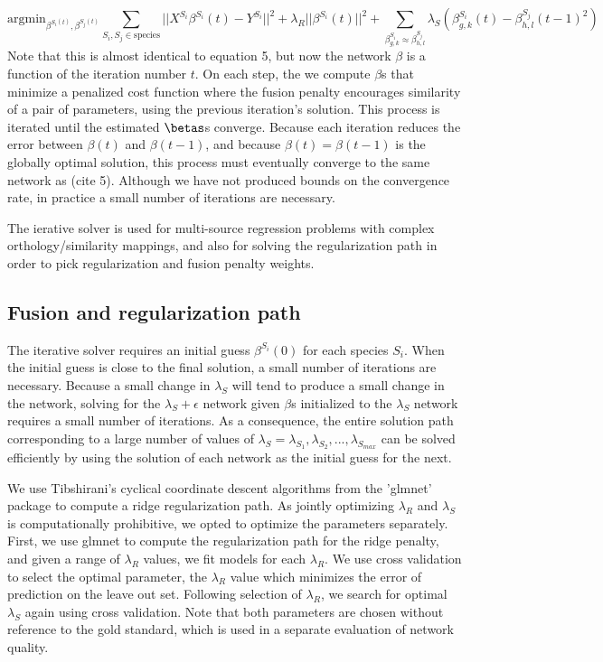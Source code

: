 \documentclass[11pt]{article}
\providecommand{\DIFadd}[1]{{\protect\color{blue}\uwave{#1}}} %
\providecommand{\DIFdel}[1]{{\protect\color{red}\sout{#1}}}                      %
\providecommand{\DIFaddbegin}{} %
\providecommand{\DIFaddend}{} %
\providecommand{\DIFdelbegin}{} %
\providecommand{\DIFdelend}{} %
\begin{document}
\begin{equation}
\text{argmin}_{\beta^{S_i(t)}, \beta^{S_j(t)}} \displaystyle\sum_{S_i, S_j \in \text{species}} ||X^{S_i}\beta^{S_i}(t) - Y^{S_i}||^2 + \lambda_R||\beta^{S_i}(t)||^2 + \displaystyle \sum_{\beta_{g,k}^{S_i} \approx \beta_{h,l}^{S_j}} \lambda_S(\beta^{S_i}_{g,k}(t) - \beta_{h,l}^{S_j}(t-1)^2)
\end{equation}
Note that this is almost identical to equation 5, but now the network $\beta$ is a function of the iteration number $t$. On each step, the we compute $\beta$s that minimize a penalized cost function where the fusion penalty encourages similarity of a pair of parameters, using the previous iteration's solution. This process is iterated until the estimated \DIFdelbegin \DIFdel{$\betas$}\DIFdelend \DIFaddbegin \DIFadd{$\beta$}\DIFaddend s converge. Because each iteration reduces the error between $\beta(t)$ and $\beta(t-1)$, and because $\beta(t) = \beta(t-1)$ is the globally optimal solution, this process must eventually converge to the same network as (cite 5). Although we have not produced bounds on the convergence rate, in practice a small number of iterations are necessary.

The ierative solver is used for multi-source regression problems with complex orthology/similarity mappings, and also for solving the regularization path in order to pick regularization and fusion penalty weights. 

\subsection{Fusion and regularization path}
The iterative solver requires an initial guess $\beta^{S_i}(0)$ for each species $S_i$. When the initial guess is close to the final solution, a small number of iterations are necessary. Because a small change in $\lambda_S$ will tend to produce a small change in the network, solving for the $\lambda_S+\epsilon$ network given $\beta$s initialized to the $\lambda_S$ network requires a small number of iterations. As a consequence, the entire solution path corresponding to a large number of values of $\lambda_S= \lambda_S_1, \lambda_S_2, ..., \lambda_S_{max}$ can be solved efficiently by using the solution of each network as the initial guess for the next. 

We use Tibshirani's cyclical coordinate descent algorithms from the 'glmnet' package \cite{friedman_regularization_2010} to compute a ridge regularization path. As jointly optimizing $\lambda_R$ and $\lambda_S$ is computationally prohibitive, we opted to optimize the parameters separately. First, we use glmnet to compute the regularization path for the ridge penalty, and given a range of $\lambda_R$ values, we fit models for each $\lambda_R$. We use cross validation to select the optimal parameter, the $\lambda_R$ value which minimizes the error of prediction on the leave out set. Following selection of $\lambda_R$, we search for optimal $\lambda_S$ again using cross validation. Note that both parameters are chosen without reference to the gold standard, which is used in a separate evaluation of network quality. 
\end{document}
